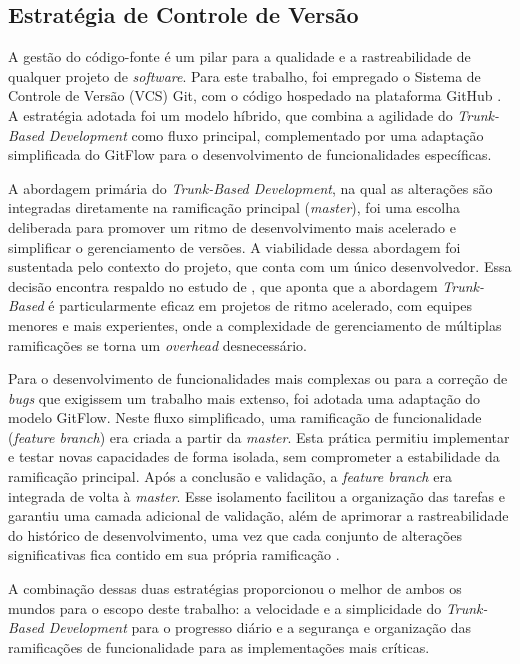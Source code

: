 \subsection[Estratégia de Controle de Versão]{Estratégia de Controle de Versão}
A gestão do código-fonte é um pilar para a qualidade e a rastreabilidade de qualquer projeto de \textit{software}. Para este trabalho, foi empregado o Sistema de Controle de Versão (VCS) Git, com o código hospedado na plataforma GitHub \cite{Git2014}. A estratégia adotada foi um modelo híbrido, que combina a agilidade do \textit{Trunk-Based Development} como fluxo principal, complementado por uma adaptação simplificada do GitFlow para o desenvolvimento de funcionalidades específicas.

A abordagem primária do \textit{Trunk-Based Development}, na qual as alterações são integradas diretamente na ramificação principal (\textit{master}), foi uma escolha deliberada para promover um ritmo de desenvolvimento mais acelerado e simplificar o gerenciamento de versões. A viabilidade dessa abordagem foi sustentada pelo contexto do projeto, que conta com um único desenvolvedor. Essa decisão encontra respaldo no estudo de , que aponta que a abordagem \textit{Trunk-Based} é particularmente eficaz em projetos de ritmo acelerado, com equipes menores e mais experientes, onde a complexidade de gerenciamento de múltiplas ramificações se torna um \textit{overhead} desnecessário.

Para o desenvolvimento de funcionalidades mais complexas ou para a correção de \textit{bugs} que exigissem um trabalho mais extenso, foi adotada uma adaptação do modelo GitFlow. Neste fluxo simplificado, uma ramificação de funcionalidade (\textit{feature branch}) era criada a partir da \textit{master}. Esta prática permitiu implementar e testar novas capacidades de forma isolada, sem comprometer a estabilidade da ramificação principal. Após a conclusão e validação, a \textit{feature branch} era integrada de volta à \textit{master}. Esse isolamento facilitou a organização das tarefas e garantiu uma camada adicional de validação, além de aprimorar a rastreabilidade do histórico de desenvolvimento, uma vez que cada conjunto de alterações significativas fica contido em sua própria ramificação \cite{Rivero2021}.

A combinação dessas duas estratégias proporcionou o melhor de ambos os mundos para o escopo deste trabalho: a velocidade e a simplicidade do \textit{Trunk-Based Development} para o progresso diário e a segurança e organização das ramificações de funcionalidade para as implementações mais críticas.


